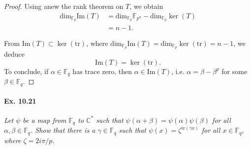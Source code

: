 \documentclass[11pt,a4paper]{article}
\newcommand{\C}{\mathbb{C}}
\newcommand{\F}{\mathbb{F}}
\begin{document}
\begin{proof}
Using anew the rank theorem on $T$, we obtain
\begin{align*}
\mathrm{dim}_{\F_p} \mathrm{Im}(T) &= \mathrm{dim}_{\F_p} \F_{p^n} - \mathrm{dim}_{\F_p} \ker(T)\\
&=n-1.
\end{align*}

From $\mathrm{Im}(T) \subset \ker(\mathrm{tr})$, where $\mathrm{dim}_{\F_p} \mathrm{Im}(T) = \mathrm{dim}_{\F_p} \ker(\mathrm{tr}) = n-1$, we deduce 
$$\mathrm{Im}(T) = \ker(\mathrm{tr}).$$
To conclude, if $\alpha \in \F_q$ has trace zero, then $\alpha \in \mathrm{Im}(T)$, i.e. $\alpha = \beta - \beta^p$ for some $\beta \in \F_q$.
\end{proof}



\paragraph{Ex. 10.21} {\it Let $\psi$ be a map from $\F_q$ to $\C^*$ such that $\psi(\alpha + \beta) = \psi(\alpha)\psi(\beta)$ for all $\alpha, \beta \in \F_q$. Show that there is a $\gamma \in \F_q$ such that $\psi(x) = \zeta^{\mathrm{tr}(\gamma x)}$ for all $x \in \F_q$, where $\zeta = {2i\pi/p}$.
}
\end{document}
